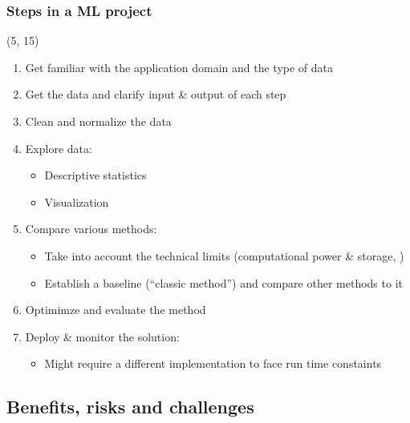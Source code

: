 \begin{frame}
  \frametitle{Steps in a \ac{ML} project}

  \begin{textblock}{90}(5, 15)
    \begin{enumerate}
    \item Get familiar with the application domain and the type of data
    \item Get the data and clarify input \& output of each step
    \item Clean and normalize the data
    \item Explore data:
      \begin{itemize}
      \item Descriptive statistics
      \item Visualization
      \end{itemize}
    \item Compare various methods:
      \begin{itemize}
      \item Take into account the technical limits (computational power \&
        storage, \etc{})
      \item Establish a baseline (``classic method'') and compare other methods
        to it
      \end{itemize}
    \item Optimimze and evaluate the method
    \item Deploy \& monitor the solution:
      \begin{itemize}
      \item Might require a different implementation to face run time constaints
      \end{itemize}
    \end{enumerate}
  \end{textblock}
\end{frame}


\subsection{Benefits, risks and challenges}

